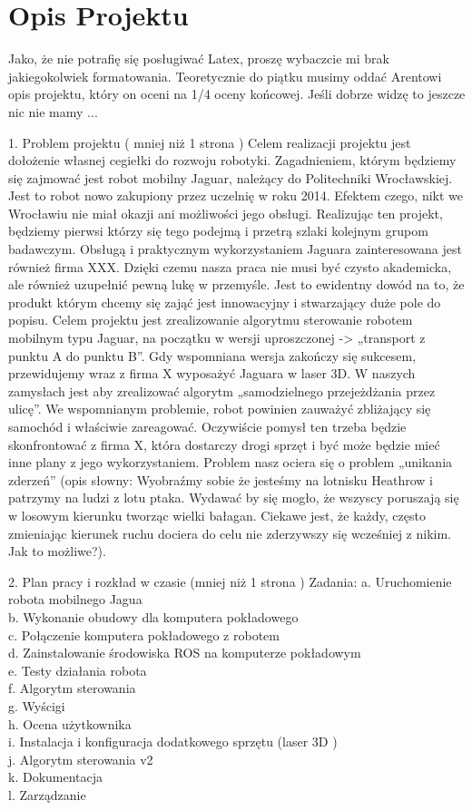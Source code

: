 \section{Opis Projektu}
Jako, że nie potrafię się posługiwać Latex, proszę wybaczcie mi brak jakiegokolwiek formatowania.
Teoretycznie do piątku musimy oddać Arentowi opis projektu, który on oceni na 1/4 oceny końcowej. Jeśli dobrze widzę to jeszcze nic nie mamy ...

1.	Problem projektu ( mniej niż 1 strona )
Celem realizacji projektu jest dołożenie własnej cegiełki do rozwoju robotyki. Zagadnieniem, którym będziemy się zajmować jest robot mobilny Jaguar, należący do Politechniki Wrocławskiej. Jest to robot nowo zakupiony przez uczelnię w roku 2014. Efektem czego, nikt we Wrocławiu nie miał okazji ani możliwości jego obsługi. Realizując ten projekt, będziemy pierwsi którzy się tego podejmą i przetrą szlaki kolejnym grupom badawczym. Obsługą i praktycznym wykorzystaniem Jaguara zainteresowana jest również firma XXX. Dzięki czemu nasza praca nie musi być czysto akademicka, ale również uzupełnić pewną lukę w przemyśle. Jest to ewidentny dowód na to, że produkt którym chcemy się zająć jest innowacyjny i stwarzający duże pole do popisu. Celem projektu jest zrealizowanie algorytmu sterowanie robotem mobilnym typu Jaguar, na początku w wersji uproszczonej -> „transport z punktu A do punktu B”. Gdy wspomniana wersja zakończy się sukcesem, przewidujemy wraz z firma X wyposażyć Jaguara w laser 3D. W naszych zamysłach jest aby zrealizować algorytm „samodzielnego przejeżdżania przez ulicę”. We wspomnianym problemie, robot powinien zauważyć zbliżający się samochód i właściwie zareagować. Oczywiście pomysł ten trzeba będzie skonfrontować z firma X, która dostarczy drogi sprzęt i być może będzie mieć inne plany z jego wykorzystaniem. Problem nasz ociera się o problem „unikania zderzeń” (opis słowny: Wyobraźmy sobie że jesteśmy na lotnisku Heathrow i patrzymy na ludzi z lotu ptaka. Wydawać by się mogło, że wszyscy poruszają się w losowym kierunku tworząc wielki bałagan. Ciekawe jest, że każdy, często zmieniając kierunek ruchu dociera do celu nie zderzywszy się wcześniej z nikim. Jak to możliwe?).\newline

2.	Plan pracy i rozkład w czasie (mniej niż 1 strona )
Zadania:\newline
a.	Uruchomienie robota mobilnego Jagua\\
b.	Wykonanie obudowy dla komputera pokładowego\\
c.	Połączenie komputera pokładowego z robotem\\
d.	Zainstalowanie środowiska ROS na komputerze pokładowym\\
e.	Testy działania robota\\
f.	Algorytm sterowania\\
g.	Wyścigi\\
h.	Ocena użytkownika\\
i.	Instalacja i konfiguracja dodatkowego sprzętu (laser 3D )\\
j.	Algorytm sterowania v2\\
k.	Dokumentacja\\
l.	Zarządzanie\\

